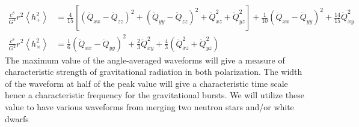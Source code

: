 \documentclass{article}
\begin{document}
\begin{align}
\frac{c^8}{G^2} r^2 \left\langle h_+^2 \right\rangle &= 
\frac{4}{15} \left[ (\ddot{Q}_{xx} - \ddot{Q}_{zz})^2 +(\ddot{Q}_{yy} - \ddot{Q}_{zz})^2 +\ddot{Q}_{xz}^2 + \ddot{Q}_{yz}^2 \right]
+\frac{1}{10} ( \ddot{Q}_{xx} - \ddot{Q}_{yy})^2 + \frac{14}{15} \ddot{Q}_{xy}^2\\
\frac{c^8}{G^2} r^2 \left\langle h_\times^2 \right\rangle &=
\frac{1}{6} ( \ddot{Q}_{xx} - \ddot{Q}_{yy})^2 + \frac{2}{3} \ddot{Q}_{xy}^2 + \frac{4}{3}(\ddot{Q}_{xz}^2 + \ddot{Q}_{yz}^2)
\end{align}
The maximum value of the angle-averaged waveforms will give a measure
of characteristic strength of gravitational radiation in both polarization. 
The width of the waveform at half of the peak value will give a characteristic
time scale hence a characteristic frequency for the gravitational bursts.
We will utilize these value to have various waveforms from merging two neutron stars and/or 
white dwarfs

\newpage
\appendix



\end{document}

